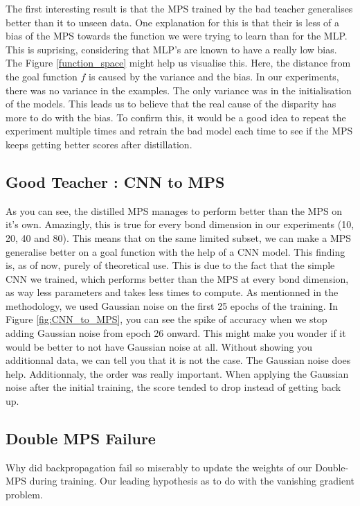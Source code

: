 \documentclass{article}
\theoremstyle{definition}
\theoremstyle{definition}
\begin{document}
The first interesting result is that the MPS trained by the bad teacher generalises better than it to unseen data. One explanation for this is that their is less of a bias of the MPS towards the function we were trying to learn than for the MLP. This is suprising, considering that MLP's are known to have a really low bias. The Figure \ref{function_space} might help us visualise this. Here, the distance from the goal function $f$ is caused by the variance and the bias. In our experiments, there was no variance in the examples. The only variance was in the initialisation of the models. This leads us to believe that the real cause of the disparity has more to do with the bias. To confirm this, it would be a good idea to repeat the experiment multiple times and retrain the bad model each time to see if the MPS keeps getting better scores after distillation.

\subsection{Good Teacher : CNN to MPS}
As you can see, the distilled MPS manages to perform better than the MPS on it's own. Amazingly, this is true for every bond dimension in our experiments (10, 20, 40 and 80). This means that on the same limited subset, we can make a MPS generalise better on a goal function with the help of a CNN model. This finding is, as of now, purely of theoretical use. This is due to the fact that the simple CNN we trained, which performs better than the MPS at every bond dimension, as way less parameters and takes less times to compute. As mentionned in the methodology, we used Gaussian noise on the first 25 epochs of the training. In Figure \ref{fig:CNN_to_MPS}, you can see the spike of accuracy when we stop adding Gaussian noise from epoch 26 onward. This might make you wonder if it would be better to not have Gaussian noise at all. Without showing you additionnal data, we can tell you that it is not the case. The Gaussian noise does help. Additionnaly, the order was really important. When applying the Gaussian noise after the initial training, the score tended to drop instead of getting back up.



\subsection{Double MPS Failure}
Why did backpropagation fail so miserably to update the weights of our Double-MPS during training. Our leading hypothesis as to do with the vanishing gradient problem. 
\end{document}
